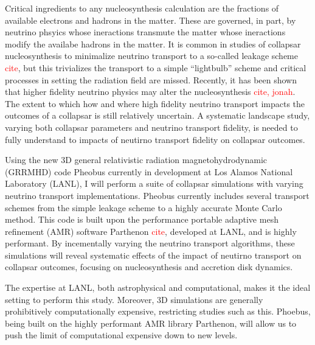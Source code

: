 \documentclass[12pt]{article}
\begin{document}
Critical ingredients to any nucleosynthesis calculation are the fractions of available electrons and hadrons in the matter.
These are governed, in part, by neutrino phsyics whose ineractions transmute the matter whose ineractions modify the availabe hadrons in the matter.
It is common in studies of collapsar nucleosynthesis to minimalize neutrino transport to a so-called leakage scheme \textcolor{red}{cite}, but this trivializes the transport to a simple ``lightbulb'' scheme and critical processes in setting the radiation field are missed.
Recently, it has been shown that higher fidelity neutrino physics may alter the nucleosynthesis \textcolor{red}{cite, jonah}.
The extent to which how and where high fidelity neutrino transport impacts the outcomes of a collapsar is still relatively uncertain.
A systematic landscape study, varying both collapsar parameters and neutrino transport fidelity, is needed to fully understand to impacts of neutirno transport fidelity on collapsar outcomes. 

Using the new 3D general relativistic radiation magnetohydrodynamic (GRRMHD) code Pheobus currently in development at Los Alamos National Laboratory (LANL), I will  perform a suite of collapsar simulations with varying neutrino transport implementations.
Pheobus currently includes several transport schemes from the simple leakage scheme to a highly accurate Monte Carlo method.
This code is built upon the performance portable adaptive mesh refinement (AMR) software Parthenon \textcolor{red}{cite}, developed at LANL, and is highly performant.
By incementally varying the neutrino transport algorithms, these simulations will reveal systematic effects of the impact of neutirno transport on collapsar outcomes, focusing on nucleosynthesis and accretion disk dynamics.

The expertise at LANL, both astrophysical and computational, makes it the ideal setting to perform this study. 
Moreover, 3D simulations are generally prohibitively computationally expensive, restricting studies such as this.
Phoebus, being built on the highly performant AMR library Parthenon, will allow us to push the limit of computational expensive down to new levels. %
\end{document}
